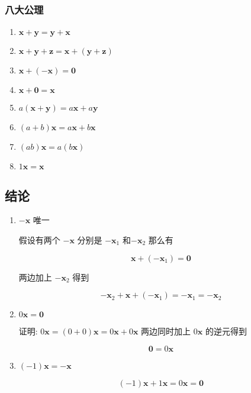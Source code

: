 \documentclass[12pt,a4paper]{ctexart}
\begin{document}
\subsubsection{八大公理}

\begin{enumerate}
    \item $\mathbf{x} + \mathbf{y} = \mathbf{y} + \mathbf{x}$
    \item $\mathbf{x} + \mathbf{y} + \mathbf{z} = \mathbf{x} + (\mathbf{y} + \mathbf{z})$
    \item $\mathbf{x} + (-\mathbf{x}) = \mathbf{0}$
    \item $\mathbf{x} + \mathbf{0} = \mathbf{x}$
    \item $a(\mathbf{x}+\mathbf{y}) = a\mathbf{x} + a\mathbf{y}$
    \item $(a+b)\mathbf{x} = a\mathbf{x} + b\mathbf{x}$
    \item $(ab)\mathbf{x} = a(b\mathbf{x})$
    \item $1\mathbf{x} = \mathbf{x}$
\end{enumerate}

\subsection{结论}

\begin{enumerate}
    \item $-\mathbf{x}$ 唯一

    假设有两个 $-\mathbf{x}$ 分别是  $-\mathbf{x}_1$ 和$-\mathbf{x}_2$
    那么有

    \[
        \mathbf{x} + (-\mathbf{x}_1) = \mathbf{0}
    \]

    两边加上 $-\mathbf{x}_2$ 得到

    \[
        -\mathbf{x}_2 + \mathbf{x} + (-\mathbf{x}_1) = -\mathbf{x}_1 = -\mathbf{x}_2
    \]


    \item $0 \mathbf{x} = \mathbf{0}$

    证明: $0\mathbf{x} = (0+0)\mathbf{x} = 0\mathbf{x} + 0\mathbf{x}$ 
    两边同时加上 $0\mathbf{x}$ 的逆元得到 

    \[
        \mathbf{0} = 0 \mathbf{x}
    \]


    \item $(-1) \mathbf{x} = -\mathbf{x}$

    \[
        (-1)\mathbf{x} + 1 \mathbf{x} = 0\mathbf{x} = \mathbf{0}
    \]

\end{enumerate}
\end{document}
